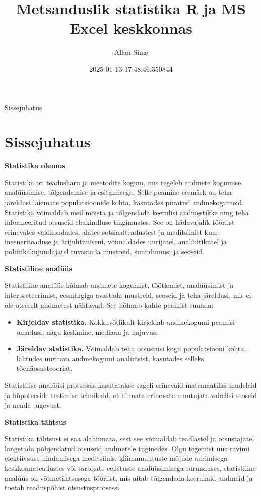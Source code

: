 \documentclass[
]{book}
\title{Metsanduslik statistika R ja MS Excel keskkonnas}
\author{Allan Sims}
\date{2025-01-13 17:48:46.350844}
\providecommand{\tightlist}{%
  \setlength{\itemsep}{0pt}\setlength{\parskip}{0pt}}
\begin{document}
\maketitle

{
\setcounter{tocdepth}{1}
\tableofcontents
}
Sissejuhatus

\chapter{Sissejuhatus}\label{sissejuhatus}

\textbf{Statistika olemus}

Statistika on teadusharu ja meetodite kogum, mis tegeleb andmete kogumise, analüüsimise, tõlgendamise ja esitamisega. Selle peamine eesmärk on teha järeldusi laiemate populatsioonide kohta, kasutades piiratud andmekogumeid. Statistika võimaldab meil mõista ja tõlgendada keerulisi andmestikke ning teha informeeritud otsuseid ebakindluse tingimustes. See on hädavajalik tööriist erinevates valdkondades, alates sotsiaalteadustest ja meditsiinist kuni inseneriteaduse ja ärijuhtimiseni, võimaldades uurijatel, analüütikutel ja poliitikakujundajatel tuvastada mustreid, suundumusi ja seoseid.

\textbf{Statistiline analüüs}

Statistiline analüüs hõlmab andmete kogumist, töötlemist, analüüsimist ja interpreteerimist, eesmärgiga avastada mustreid, seoseid ja teha järeldusi, mis ei ole otseselt andmetest nähtavad. See hõlmab kahte peamist suunda:

\begin{itemize}
\tightlist
\item
  \textbf{Kirjeldav statistika.} Kokkuvõtlikult kirjeldab andmekogumi peamisi omadusi, nagu keskmine, mediaan ja hajuvus.
\item
  \textbf{Järeldav statistika.} Võimaldab teha otsustusi kogu populatsiooni kohta, lähtudes uuritava andmekogumi analüüsist, kasutades selleks tõenäosusteooriat.
\end{itemize}

Statistilise analüüsi protsessis kasutatakse sageli erinevaid matemaatilisi mudeleid ja hüpoteeside testimise tehnikaid, et hinnata erinevate muutujate vahelisi seoseid ja nende tugevust.

\textbf{Statistika tähtsus}

Statistika tähtsust ei saa alahinnata, sest see võimaldab teadlastel ja otsustajatel langetada põhjendatud otsuseid andmetele tuginedes. Olgu tegemist uue ravimi efektiivsuse hindamisega meditsiinis, kliimamuutuste mõjude uurimisega keskkonnateadustes või tarbijate eelistuste analüüsimisega turunduses, statistiline analüüs on võtmetähtsusega tööriist, mis aitab tõlgendada keerukaid andmeid ja toetab teaduspõhist otsustusprotsessi.
\end{document}
